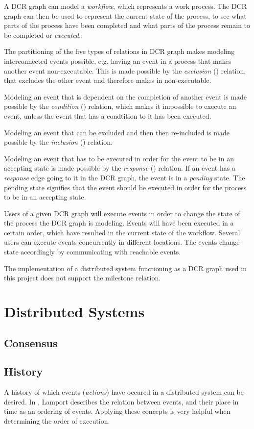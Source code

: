 	A DCR graph can model a \textit{workflow}, which represents a work process. The DCR graph can then be used to represent the current state of the process, to see what parts of the process have been completed and what parts of the process remain to be completed or \textit{executed}. 
	
	The partitioning of the five types of relations in DCR graph makes modeling interconnected events possible, e.g. having an event in a process that makes another event non-executable. This is made possible by the \textit{exclusion} (\exclusion) relation, that excludes the other event and therefore makes in non-executable. 
	
	Modeling an event that is dependent on the completion of another event is made possible by the \textit{condition} (\condition) relation, which makes it impossible to execute an event, unless the event that has a condtition to it has been executed.
	
	Modeling an event that can be excluded and then then re-included is made possible by the \textit{inclusion} (\inclusion) relation. 
	
	Modeling an event that has to be executed in order for the event to be in an accepting state  is made possible by the \textit{response} (\response) relation. If an event has a \textit{response} edge going to it in the DCR graph, the event is in a \textit{pending} state. The pending state signifies that the event should be executed in order for the process to be in an accepting state.
	
	Users of a given DCR graph will execute events in order to change the state of the process the DCR graph is modeling. Events will have been executed in a certain order, which have resulted in the current state of the workflow. Several users can execute events concurrently in different locations. The events change state accordingly by communicating with reachable events. 
	
	The implementation of a distributed system functioning as a DCR graph used in this project does not support the milestone relation. 
	\section{Distributed Systems}
		\subsection{Consensus}
		\subsection{History}
		A history of which events (\textit{actions}) have occured in a distributed system can be desired. In \cite{Lamport:1978:TCO:359545.359563}, Lamport describes the relation between events, and their place in time as an ordering of events. Applying these concepts is very helpful when determining the order of execution. 
		

